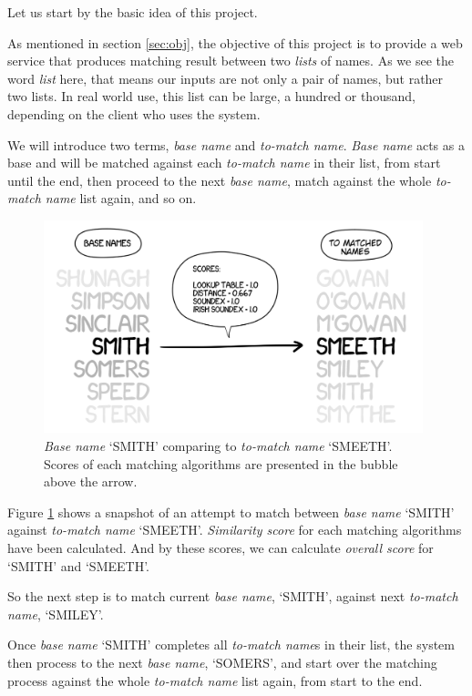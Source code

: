 Let us start by the basic idea of this project.

As mentioned in section \ref{sec:obj}, the objective of this project is
to provide a web service that produces matching result between two
\emph{lists} of names. As we see the word \emph{list} here, that means
our inputs are not only a pair of names, but rather two lists.
In real world use, this list can be large, a hundred or thousand,
depending on the client who uses the system.

We will introduce two terms, \emph{base name} and \emph{to-match name}.
\emph{Base name} acts as a base and will be matched against each
\emph{to-match name} in their list, from start until the end, then
proceed to the next \emph{base name}, match against the whole
\emph{to-match name} list again, and so on.

\begin{figure}[H]
\centering
\captionsetup{justification=centering}
\includegraphics[width=11cm]{gfx/base_tmn}
\caption[\emph{Base name} `SMITH' comparing to \emph{to-match name} `SMEETH'.]{\emph{Base name}
`SMITH' comparing to \emph{to-match name} `SMEETH'. \\
Scores of each matching algorithms
are presented in the bubble above the arrow.}
\label{fig:base_tmn}
\end{figure}

Figure \ref{fig:base_tmn} shows a snapshot of an attempt to match between
\emph{base name} `SMITH' against \emph{to-match name} `SMEETH'.
\emph{Similarity score} for each matching algorithms have been calculated.
And by these scores, we can calculate \emph{overall score} for `SMITH'
and `SMEETH'.

So the next step is to match current \emph{base name}, `SMITH',
against next \emph{to-match name}, `SMILEY'.

Once \emph{base name} `SMITH' completes all \emph{to-match name}\textquotesingle s in their list,
the system then process to the next \emph{base name}, `SOMERS', and start over
the matching process against the whole \emph{to-match name} list again, from
start to the end.

